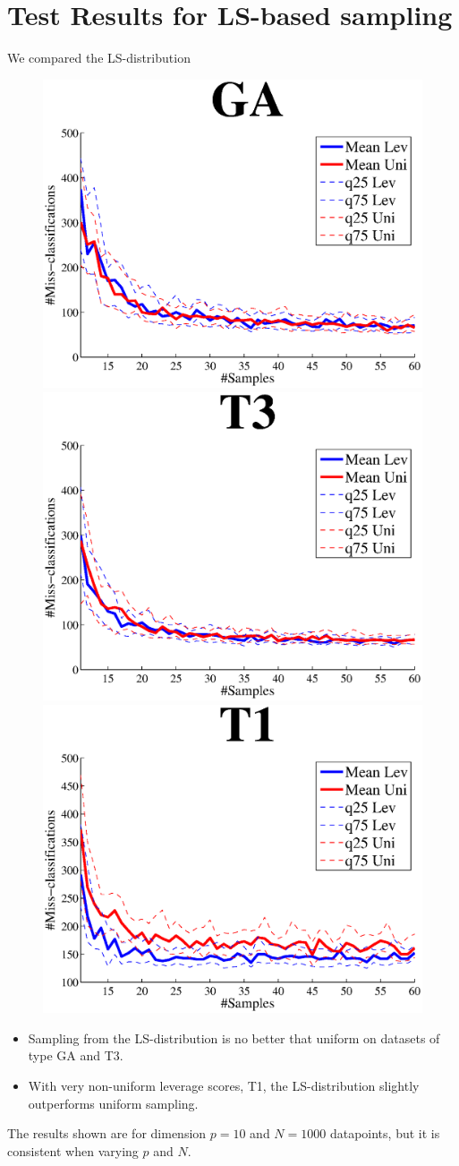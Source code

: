 \documentclass{article}
\begin{document}
\section{Test Results for LS-based sampling}
We compared the LS-distribution 
\begin{figure}[t]
\centering
\includegraphics[width=.49\linewidth]{images/GA.eps}
\includegraphics[width=.49\linewidth]{images/T3.eps}
\includegraphics[width=.49\linewidth]{images/T1.eps}
\end{figure}	
\begin{itemize}
\item Sampling from the LS-distribution is no better that uniform on datasets of type GA and T3.
\item With very non-uniform leverage scores, T1, the LS-distribution slightly outperforms uniform sampling.
\end{itemize}
The results shown are for dimension $p = 10$ and $N = 1000$ datapoints, but it is consistent when varying $p$ and $N$. \\
%
\end{document}
